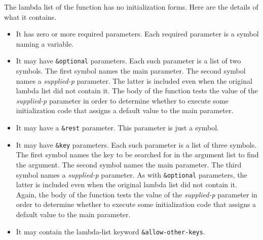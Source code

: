 The lambda list of the function has no initialization forms.  Here are
the details of what it contains.

\begin{itemize}
\item It has zero or more required parameters.  Each required
  parameter is a symbol naming a variable.
\item It may have \texttt{\&optional} parameters.  Each such parameter
  is a list of two symbols.  The first symbol names the main parameter.
  The second symbol names a \emph{supplied-p} parameter.  The latter
  is included even when the original lambda list did not contain it.
  The body of the function tests the value of the \emph{supplied-p}
  parameter in order to determine whether to execute some
  initialization code that assigns a default value to the main
  parameter.
\item It may have a \texttt{\&rest} parameter.  This parameter is just
  a symbol.
\item It may have \texttt{\&key} parameters.  Each such parameter is a
  list of three symbols.  The first symbol names the key to be
  searched for in the argument list to find the argument.  The second
  symbol names the main parameter.  The third symbol names a
  \emph{supplied-p} parameter.  As with \texttt{\&optional}
  parameters, the latter is included even when the original lambda
  list did not contain it.  Again, the body of the function tests the
  value of the \emph{supplied-p} parameter in order to determine
  whether to execute some initialization code that assigns a default
  value to the main parameter.
\item It may contain the lambda-list keyword
  \texttt{\&allow-other-keys}.
\end{itemize}


